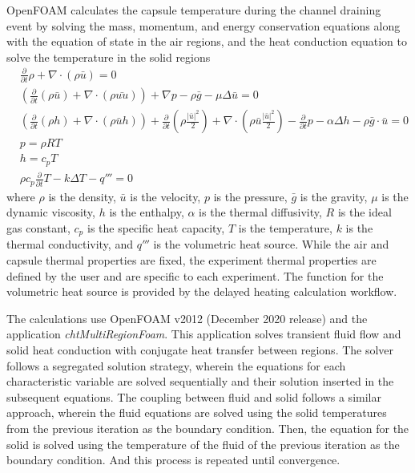 OpenFOAM calculates the capsule temperature during the channel draining event by solving the mass, momentum, and energy conservation equations along with the equation of state in the air regions, and the heat conduction equation to solve the temperature in the solid regions \cite{weller_tensorial_1998}
\begin{align}
& \frac{\partial}{\partial t} \rho + \nabla \cdot (\rho \bar{u}) = 0  \label{eq:consv-mass} \\
& \left( \frac{\partial}{\partial t} (\rho \bar{u}) + \nabla \cdot \left( \rho \bar{u u} \right) \right) + \nabla p - \rho \bar{g} - \mu \Delta \bar{u} = 0 \label{eq:consv-mom} \\
& \left( \frac{\partial}{\partial t} (\rho h) + \nabla \cdot \left( \rho \bar{u} h \right) \right) + \frac{\partial}{\partial t} \left( \rho \frac{|\bar{u}|^2}{2} \right) + \nabla \cdot \left( \rho \bar{u} \frac{|\bar{u}|^2}{2} \right) - \frac{\partial}{\partial t}p - \alpha \Delta h - \rho \bar{g} \cdot \bar{u} = 0 \label{eq:consv-ene-f} \\
& p = \rho R T \label{eq:state} \\
& h = c_p T \\
& \rho c_p \frac{\partial}{\partial t} T - k \Delta T - q''' = 0 \label{eq:consv-ene-s}
\end{align}
where $\rho$ is the density, $\bar{u}$ is the velocity, $p$ is the pressure, $\bar{g}$ is the gravity, $\mu$ is the dynamic viscosity, $h$ is the enthalpy, $\alpha$ is the thermal diffusivity, $R$ is the ideal gas constant, $c_p$ is the specific heat capacity, $T$ is the temperature, $k$ is the thermal conductivity, and $q'''$ is the volumetric heat source.
While the air and capsule thermal properties are fixed, the experiment thermal properties are defined by the user and are specific to each experiment.
The function for the volumetric heat source is provided by the delayed heating calculation workflow.

The calculations use OpenFOAM v2012 (December 2020 release) and the application \textit{chtMultiRegionFoam}.
This application solves transient fluid flow and solid heat conduction with conjugate heat transfer between regions.
The solver follows a segregated solution strategy, wherein the equations for each characteristic variable are solved sequentially and their solution inserted in the subsequent equations.
The coupling between fluid and solid follows a similar approach, wherein the fluid equations are solved using the solid temperatures from the previous iteration as the boundary condition.
Then, the equation for the solid is solved using the temperature of the fluid of the previous iteration as the boundary condition.
And this process is repeated until convergence.

